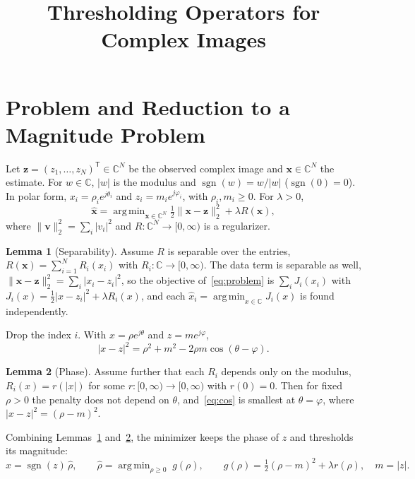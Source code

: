 \documentclass[11pt,a4paper]{article}
\title{Thresholding Operators for Complex Images}
\date{}
\theoremstyle{definition}
\newtheorem{lemma}{Lemma}
\newcommand{\C}{\mathbb{C}}
\DeclareMathOperator*{\argmin}{arg\,min}
\DeclareMathOperator{\sgn}{sgn}
\begin{document}
\maketitle

\section{Problem and Reduction to a Magnitude Problem}

Let $\mathbf z = (z_1,\dots,z_N)^{\mathsf T}\in\C^N$ be the observed complex image and
$\mathbf x\in\C^N$ the estimate. For $w\in\C$, $|w|$ is the modulus and
$\sgn(w) = w/|w|$ ($\sgn(0)=0$). In polar form,
$x_i = \rho_i e^{j\theta_i}$ and $z_i = m_i e^{j\varphi_i}$, with $\rho_i,m_i\ge0$.
For $\lambda>0$,
\begin{equation}\label{eq:problem}
  \hat{\mathbf x} = \argmin_{\mathbf x\in\C^N}
  \tfrac12\lVert \mathbf x - \mathbf z\rVert_2^2 + \lambda R(\mathbf x),
\end{equation}
where $\lVert\mathbf v\rVert_2^2 = \sum_i |v_i|^2$ and $R:\C^N\to[0,\infty)$ is a regularizer.

\begin{lemma}[Separability]\label{lem:sep}
Assume $R$ is separable over the entries, $R(\mathbf x) = \sum_{i=1}^N R_i(x_i)$ with
$R_i:\C\to[0,\infty)$. The data term is separable as well,
$\lVert\mathbf x-\mathbf z\rVert_2^2 = \sum_i|x_i-z_i|^2$, so the objective of~\eqref{eq:problem}
is $\sum_i J_i(x_i)$ with $J_i(x) = \tfrac12|x-z_i|^2 + \lambda R_i(x)$, and each
$\hat x_i = \argmin_{x\in\C} J_i(x)$ is found independently.
\end{lemma}

Drop the index $i$. With $x=\rho e^{j\theta}$ and $z = m e^{j\varphi}$,
\begin{equation}\label{eq:cos}
  |x - z|^2 = \rho^2 + m^2 - 2\rho m\cos(\theta-\varphi).
\end{equation}

\begin{lemma}[Phase]\label{lem:phase}
Assume further that each $R_i$ depends only on the modulus, $R_i(x) = r(|x|)$ for some
$r:[0,\infty)\to[0,\infty)$ with $r(0)=0$. Then for fixed $\rho>0$ the penalty does not depend
on $\theta$, and~\eqref{eq:cos} is smallest at $\theta=\varphi$, where $|x-z|^2 = (\rho-m)^2$.
\end{lemma}

Combining Lemmas~\ref{lem:sep} and~\ref{lem:phase}, the minimizer keeps the phase of $z$ and
thresholds its magnitude:
\begin{equation}\label{eq:mag}
  \hat x = \sgn(z)\,\hat\rho,\qquad
  \hat\rho = \argmin_{\rho\ge 0}\; g(\rho),\qquad
  g(\rho) = \tfrac12(\rho - m)^2 + \lambda r(\rho),\quad m = |z| .
\end{equation}
\end{document}
